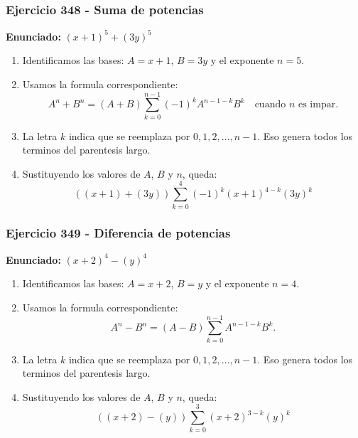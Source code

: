 \documentclass[11pt,a4paper]{article}
\begin{document}
\subsubsection*{Ejercicio 348 - Suma de potencias}
\textbf{Enunciado:} $ \left(x + 1\right)^{5}+\left(3 y\right)^{5} $\par
\begin{enumerate}[leftmargin=2em]
\item Identificamos las bases: \(A=x + 1\), \(B=3 y\) y el exponente \(n=5\).
\item Usamos la formula correspondiente: \[A^n+B^n=(A+B)\sum_{k=0}^{n-1}(-1)^kA^{n-1-k}B^k\quad\text{cuando }n\text{ es impar}.\]
\item La letra \(k\) indica que se reemplaza por \(0,1,2,\ldots,n-1\). Eso genera todos los terminos del parentesis largo.
\item Sustituyendo los valores de \(A\), \(B\) y \(n\), queda: \[\boxed{\left(\left(x + 1\right)+\left(3 y\right)\right)\sum_{k=0}^{4}(-1)^k\left(x + 1\right)^{4-k}\left(3 y\right)^k}\]
\end{enumerate}

\vspace{0.2cm}
\subsubsection*{Ejercicio 349 - Diferencia de potencias}
\textbf{Enunciado:} $ \left(x + 2\right)^{4}-\left(y\right)^{4} $\par
\begin{enumerate}[leftmargin=2em]
\item Identificamos las bases: \(A=x + 2\), \(B=y\) y el exponente \(n=4\).
\item Usamos la formula correspondiente: \[A^n-B^n=(A-B)\sum_{k=0}^{n-1}A^{n-1-k}B^k.\]
\item La letra \(k\) indica que se reemplaza por \(0,1,2,\ldots,n-1\). Eso genera todos los terminos del parentesis largo.
\item Sustituyendo los valores de \(A\), \(B\) y \(n\), queda: \[\boxed{\left(\left(x + 2\right)-\left(y\right)\right)\sum_{k=0}^{3}\left(x + 2\right)^{3-k}\left(y\right)^k}\]
\end{enumerate}

\vspace{0.2cm}
\end{document}
